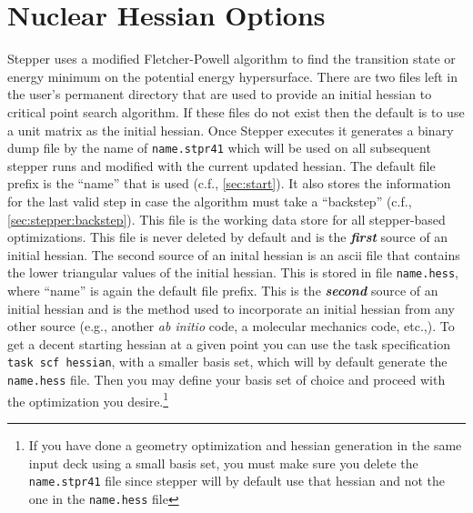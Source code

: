 \section{Nuclear Hessian Options}
Stepper uses a modified Fletcher-Powell algorithm to find the
transition state or energy minimum on the potential energy
hypersurface.  There are two files left in the user's permanent
directory that are used to provide an initial hessian to critical
point search algorithm.  If these files do not exist then the default
is to use a unit matrix as the initial hessian.  Once Stepper executes
it generates a binary dump file by the name of \verb+name.stpr41+
which will be used on all subsequent stepper runs and modified with
the current updated hessian.  The default file prefix is the ``name''
that is used (c.f., \ref{sec:start}). It also stores the information
for the last valid step in case the algorithm must take a ``backstep''
(c.f., \ref{sec:stepper:backstep}).  This file is the working data
store for all stepper-based optimizations.  This file is never deleted
by default and is the {\bf\it first} source of an initial hessian.
The second source of an inital hessian is an ascii file that contains
the lower triangular values of the initial hessian.  This is stored in
file \verb+name.hess+, where ``name'' is again the default file
prefix.  This is the {\bf\it second} source of an initial hessian and
is the method used to incorporate an initial hessian from any other
source (e.g., another {\it ab initio} code, a molecular mechanics
code, etc.,).  To get a decent starting hessian at a given point you
can use the task specification \verb+task scf hessian+, with a smaller
basis set, which will by default generate the \verb+name.hess+ file.
Then you may define your basis set of choice and proceed with the
optimization you desire.\footnote{If you have done a geometry
optimization and hessian generation in the same input deck using a
small basis set, you must make sure you delete the \verb+name.stpr41+
file since stepper will by default use that hessian and not the one in
the \verb+name.hess+ file}

